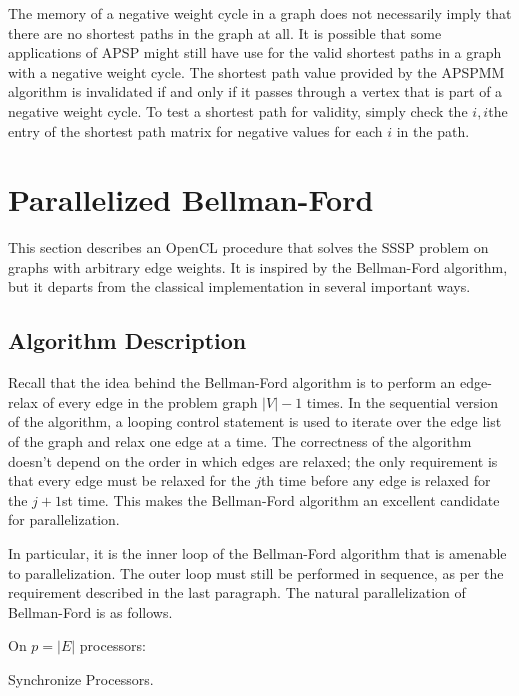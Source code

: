 \documentclass[12pt,twoside]{reedthesis}
\newcommand{\var}[1]{{\mbox{\tt#1}}}
\begin{document}
The memory of a negative weight cycle in a graph does not necessarily imply that there are no shortest paths in the graph at all. It is possible that some applications of APSP might still have use for the valid shortest paths in a graph with a negative weight cycle. The shortest path value provided by the APSPMM algorithm is invalidated if and only if it passes through a vertex that is part of a negative weight cycle. To test a shortest path for validity, simply check the $i,i$the entry of the shortest path matrix for negative values for each $i$ in the path.

\section{Parallelized Bellman-Ford}

This section describes an OpenCL procedure that solves the SSSP problem on graphs with arbitrary edge weights. It is inspired by the Bellman-Ford algorithm, but it departs from the classical implementation in several important ways. 

\subsection{Algorithm Description}

Recall that the idea behind the Bellman-Ford algorithm is to perform an edge-relax of every edge in the problem graph $|V|-1$ times. In the sequential version of the algorithm, a looping control statement is used to iterate over the edge list of the graph and relax one edge at a time. The correctness of the algorithm doesn't depend on the order in which edges are relaxed; the only requirement is that every edge must be relaxed for the $j$th time before any edge is relaxed for the $j+1$st time. This makes the Bellman-Ford algorithm an excellent candidate for parallelization.

In particular, it is the inner loop of the Bellman-Ford algorithm that is amenable to parallelization. The outer loop must still be performed in sequence, as per the requirement described in the last paragraph. The natural parallelization of Bellman-Ford is as follows.

\begin{algorithm}
On $p = |E|$ processors:
\begin{algorithmic}[1]
\STATE \var{edge-relax(edges[id])}
\STATE Synchronize Processors.
\ENDFOR
\end{algorithmic}
\end{algorithm}
\end{document}
